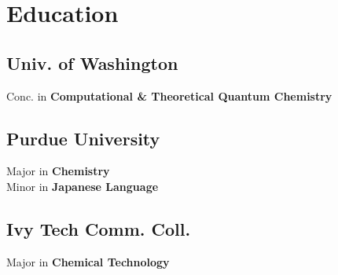 \documentclass[letterpaper]{deedy-resume} %
\begin{document}
\begin{minipage}[t]{0.32\textwidth} %



\section{Education} 
\subsection{Univ. of Washington}
Conc. in \textbf{Computational \& Theoretical Quantum Chemistry}

\sectionspace %


\subsection{Purdue University}
Major in \textbf{Chemistry}\\
Minor in \textbf{Japanese Language}

\sectionspace

\subsection{Ivy Tech Comm. Coll.}
Major in \textbf{Chemical Technology}



\end{minipage}
\end{document}

